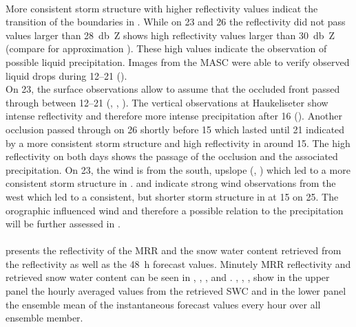 \\
More consistent storm structure with higher reflectivity values indicat the transition of the boundaries in .
While on \num{23} and \SI{26}{\dec} the reflectivity did not pass values larger than \SI{28}{\decibel Z} shows  high reflectivity values larger than \SI{30}{\decibel Z} (compare for approximation ). These high values indicate the observation of possible liquid precipitation. Images from the MASC were able to verify observed liquid drops during \SIrange{12}{21}{\UTC} (). 
\\
On \SI{23}{\dec}, the surface observations allow to assume that the occluded front passed through between \SIrange{12}{21}{\UTC} (, , ). The vertical observations at Haukeliseter show intense reflectivity and therefore more intense precipitation after \SI{16}{\UTC} (). Another occlusion passed through on \SI{26}{\dec} shortly before \SI{15}{\UTC} which lasted until \SI{21}{\UTC} indicated by a more consistent storm structure and high reflectivity in  around \SI{15}{\UTC}. The high reflectivity on both days shows the passage of the occlusion and the associated precipitation. On \SI{23}{\dec}, the wind is from the south, upslope (, ) which led to a more consistent storm structure in .  and  indicate strong wind observations from the west which led to a consistent, but shorter storm structure in  at \SI{15}{\UTC} on \SI{25}{\dec}. The orographic influenced wind and therefore a possible relation to the precipitation will be further assessed in . 
\\
\\
 presents the reflectivity of the MRR and the snow water content retrieved from the reflectivity as well as the \SI{48}{\hour} forecast values. Minutely MRR reflectivity and retrieved snow water content can be seen in , , , and . , , ,  show in the upper panel the hourly averaged values from the retrieved SWC and in the lower panel the ensemble mean of the instantaneous forecast values every hour over all ensemble member.   
